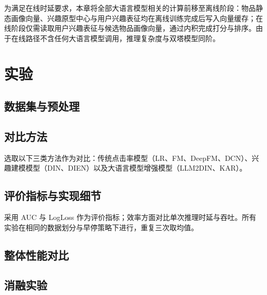 为满足在线时延要求，本章将全部大语言模型相关的计算前移至离线阶段：物品静态画像向量、兴趣原型中心与用户兴趣表征均在离线训练完成后写入向量缓存；在线阶段仅需读取用户兴趣表征与候选物品画像向量，通过内积完成打分与排序。由于在线路径不含任何大语言模型调用，推理复杂度与双塔模型同阶。

\section{实验}
\label{sec:llm-experiments}

\subsection{数据集与预处理}
\label{subsec:llm-datasets}


\subsection{对比方法}
\label{subsec:llm-baselines}

选取以下三类方法作为对比：传统点击率模型（LR、FM、DeepFM、DCN）、兴趣建模模型（DIN、DIEN）以及大语言模型增强模型（LLM2DIN、KAR）。

\subsection{评价指标与实现细节}
\label{subsec:llm-metrics}

采用 AUC 与 LogLoss 作为评价指标；效率方面对比单次推理时延与吞吐。所有实验在相同的数据划分与早停策略下进行，重复三次取均值。


\subsection{整体性能对比}
\label{subsec:llm-overall}


\subsection{消融实验}
\label{subsec:llm-ablation}


